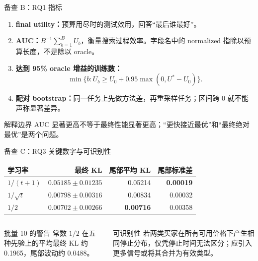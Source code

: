 \begin{frame}{备查 B：RQ1 指标}
\small
\begin{enumerate}
  \item \textbf{final utility：}预算用尽时的测试效用，回答“最后谁最好”。
  \item \textbf{AUC：}$B^{-1}\sum_{b=1}^{B}U_b$，衡量搜索过程效率。字段名中的 normalized 指除以预算长度，不是除以 oracle。
  \item \textbf{达到 95\% oracle 增益的训练数：}
  \[
  \min\{b:U_b\ge U_0+0.95\max(0,U^*-U_0)\}.
  \]
  \item \textbf{配对 bootstrap：}同一任务上先做方法差，再重采样任务；区间跨 0 就不能声称显著差异。
\end{enumerate}
\begin{alertblock}{解释边界}
AUC 显著更高不等于最终性能显著更高；“更快接近最优”和“最终绝对最优”是两个问题。
\end{alertblock}
\end{frame}

\begin{frame}{备查 C：RQ3 关键数字与可识别性}
\begin{table}
\centering
\small
\begin{tabular}{lrrr}
\toprule
学习率 & 最终 KL & 尾部平均 KL & 尾部标准差\\
\midrule
$1/(t+1)$ & $0.05185\pm0.01235$ & 0.05214 & \textbf{0.00019}\\
$1/\sqrt t$ & $0.00798\pm0.00316$ & 0.00834 & 0.00032\\
$1/2$ & \textbf{$0.00702\pm0.00266$} & \textbf{0.00716} & 0.00358\\
\bottomrule
\end{tabular}
\end{table}
\begin{columns}[T,onlytextwidth]
\begin{block}{批量 10 的警告}
常数 $1/2$ 在五种先验上的平均最终 KL 约 0.1965，尾部波动约 0.0488。
\end{block}
\begin{alertblock}{可识别性}
若两类买家在所有可用价格下产生相同停止分布，仅凭停止时间无法区分；应引入更多信号或将其合并为有效类型。
\end{alertblock}
\end{columns}
\end{frame}
\fi
